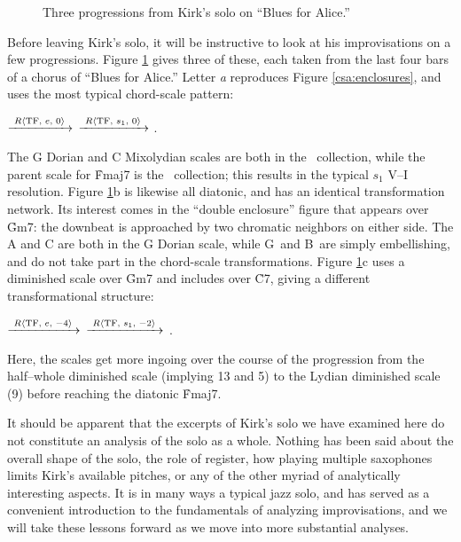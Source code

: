\begin{figure}[tbp]
  \caption{Three \tfo progressions from Kirk's solo on ``Blues for Alice.''}
  \label{csa:kirk-tfo-progs}
\end{figure}

Before leaving Kirk's solo, it will be instructive to look at his
improvisations on a few \tfo progressions. Figure \ref{csa:kirk-tfo-progs}
gives three of these, each taken from the last four bars of a chorus of
``Blues for Alice.''  Letter \emph{a} reproduces Figure
\ref{csa:enclosures},
and uses the most typical \tfo chord-scale pattern: \\
{\centering {}
  $\xrightarrow{\text{ \mbox{\ensuremath{R\langle}TF, $e$, $0$\ensuremath{\rangle}} }}$ 
  $\xrightarrow{\text{ \mbox{\ensuremath{R\langle}TF, $s_1$, $0$\ensuremath{\rangle}} }}$ . \par
}
\noindent The G Dorian and C Mixolydian scales are both in the \flat\
collection, while the parent scale for \h{Fmaj7} is the \nat\ collection; this
results in the typical $s_1$ V--I resolution.\fn{csa-11} Figure
\ref{csa:kirk-tfo-progs}b is likewise all diatonic, and has an identical
transformation network. Its interest comes in the ``double enclosure'' figure
that appears over \h{Gm7}: the downbeat \Bflat is approached by two chromatic
neighbors on either side. The A and C are both in the G Dorian scale, while
G\sharp\ and B\nat\ are simply embellishing, and do not take part in the
chord-scale transformations. Figure \ref{csa:kirk-tfo-progs}c uses a
diminished scale over \h{Gm7} and
includes \Dflat over \h{C7}, giving a different transformational structure: \\
{\centering \cst{Gm7}{\flat}{HW dim.}
  $\xrightarrow{\text{ \mbox{\ensuremath{R\langle}TF, $e$, $-4$\ensuremath{\rangle}} }}$ 
  $\xrightarrow{\text{ \mbox{\ensuremath{R\langle}TF, $s_1$, $-2$\ensuremath{\rangle}} }}$
  . \par
}
\noindent Here, the scales get more ingoing over the course of the progression
from the half--whole diminished scale (implying \flat{}13 and \flat{}5) to the
Lydian diminished scale (\flat{}9) before reaching the diatonic \h{Fmaj7}.

It should be apparent that the excerpts of Kirk's solo we have examined here
do not constitute an analysis of the solo as a whole. Nothing has been said
about the overall shape of the solo, the role of register, how playing
multiple saxophones limits Kirk's available pitches, or any of the other
myriad of analytically interesting aspects. It is in many ways a typical jazz
solo, and has served as a convenient introduction to the fundamentals of
analyzing improvisations, and we will take these lessons forward as we move
into more substantial analyses.

